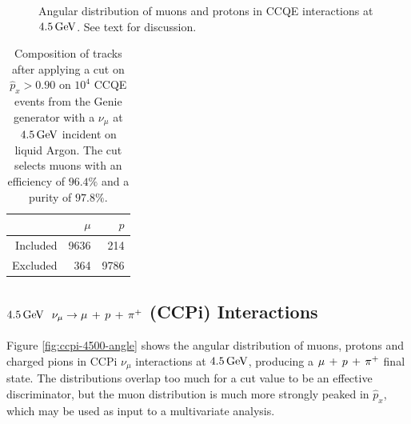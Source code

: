 \begin{figure}
{        \label{fig:ccqe-pz-4500}
    }
    \caption[Angular distribution of $\mu$, $p$ at $4.5\GeV$]{\label{fig:ccqe-4500-angle}Angular distribution of muons and protons in \acs{CCQE} interactions at $4.5\GeV$. See text for discussion.}
\end{figure}

\begin{table}
    \centering
    \begin{tabular}{*{3}{r}}
        & $\mu$ & $p$ \\
        \hline
        \hline
        Included & 9636 & 214 \\
        Excluded & 364 & 9786 \\
        \hline
    \end{tabular}
    \caption[Composition of tracks after cut on $\hat{p}_x$ for $4.5\GeV$ \acs{CCQE} events]{\label{table:cut-results-ccqe-4500-angle}Composition of tracks after applying a cut on $\hat{p}_x > 0.90$ on $10^4$ \acs{CCQE} events from the Genie generator with a $\nu_\mu$ at $4.5\GeV$ incident on liquid Argon. The cut selects muons with an efficiency of $96.4\%$ and a purity of $97.8\%$.}
\end{table}

\subsection{$4.5\GeV$ $\nu_\mu \rightarrow \mu\,+\,p\,+\,\pi^{+}$ (\acs{CCPi}) Interactions}
Figure \ref{fig:ccpi-4500-angle} shows the angular distribution of muons, protons and charged pions in \acs{CCPi} $\nu_\mu$ interactions at $4.5\GeV$, producing a $\mu\,+\,p\,+\,\pi^{+}$ final state. The distributions overlap too much for a cut value to be an effective discriminator, but the muon distribution is much more strongly peaked in $\hat{p}_x$, which may be used as input to a multivariate analysis.

